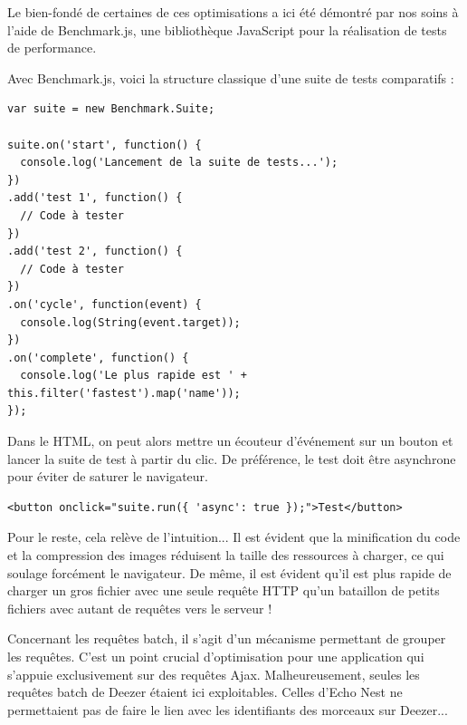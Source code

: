 \documentclass[a4paper,12pt]{article}
\begin{document}
Le bien-fondé de certaines de ces optimisations a ici été démontré par nos soins à l'aide de Benchmark.js, une bibliothèque JavaScript pour la réalisation de tests de performance.

Avec Benchmark.js, voici la structure classique d'une suite de tests comparatifs :

\newpage

\begin{lstlisting}
var suite = new Benchmark.Suite;

suite.on('start', function() {
  console.log('Lancement de la suite de tests...');
})
.add('test 1', function() {
  // Code à tester
})
.add('test 2', function() {
  // Code à tester
})
.on('cycle', function(event) {
  console.log(String(event.target));
})
.on('complete', function() {
  console.log('Le plus rapide est ' + this.filter('fastest').map('name'));
});
\end{lstlisting}

Dans le HTML, on peut alors mettre un écouteur d'événement sur un bouton et lancer la suite de test à partir du clic. De préférence, le test doit être asynchrone pour éviter de saturer le navigateur.

\vspace{7pt}

\begin{lstlisting}
<button onclick="suite.run({ 'async': true });">Test</button>
\end{lstlisting}

Pour le reste, cela relève de l'intuition... Il est évident que la minification du code et la compression des images réduisent la taille des ressources à charger, ce qui soulage forcément le navigateur. De même, il est évident qu'il est plus rapide de charger un gros fichier avec une seule requête HTTP qu'un bataillon de petits fichiers avec autant de requêtes vers le serveur !

Concernant les requêtes batch, il s'agit d'un mécanisme permettant de grouper les requêtes. C'est un point crucial d'optimisation pour une application qui s'appuie exclusivement sur des requêtes Ajax. Malheureusement, seules les requêtes batch de Deezer étaient ici exploitables. Celles d'Echo Nest ne permettaient pas de faire le lien avec les identifiants des morceaux sur Deezer...

\newpage

\end{document}

